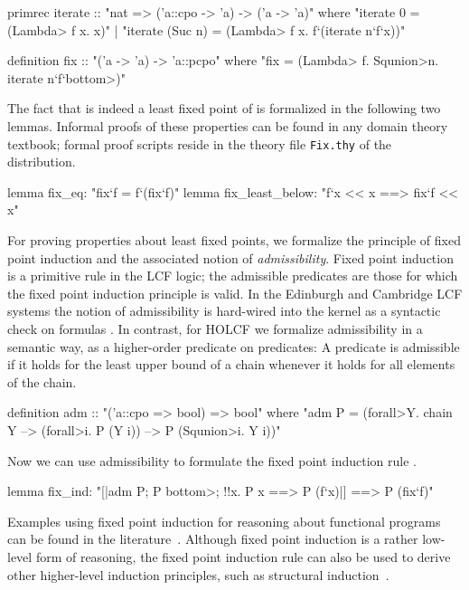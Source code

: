 \begin{isacode}
primrec iterate :: "nat => ('a::cpo -> 'a) -> ('a -> 'a)"
  where "iterate 0 = (\<Lambda> f x. x)"
  | "iterate (Suc n) = (\<Lambda> f x. f`(iterate n`f`x))"
\end{isacode}
\unmedskip
{}
\begin{isacode}
definition fix :: "('a -> 'a) -> 'a::pcpo"
  where "fix = (\<Lambda> f. \<Squnion>n. iterate n`f`\<bottom>)"
\end{isacode}

The fact that  is indeed a least fixed point of  is formalized in the following two lemmas. Informal proofs of these properties can be found in any domain theory textbook; formal proof scripts reside in the theory file \texttt{Fix.thy} of the  distribution.

\begin{isacodes}
lemma fix_eq: "fix`f = f`(fix`f)"
lemma fix_least_below: "f`x << x ==> fix`f << x"
\end{isacodes}

For proving properties about least fixed points, we formalize the principle of fixed point induction and the associated notion of \emph{admissibility}. Fixed point induction is a primitive rule in the LCF logic; the admissible predicates are those for which the fixed point induction principle is valid. In the Edinburgh and Cambridge LCF systems the notion of admissibility is hard-wired into the kernel as a syntactic check on formulas \cite{GMW79, paulson87lcf}. In contrast, for HOLCF we formalize admissibility in a semantic way, as a higher-order predicate on predicates: A predicate  is admissible if it holds for the least upper bound of a chain whenever it holds for all elements of the chain.

\begin{isacode}
definition adm :: "('a::cpo => bool) => bool"
  where "adm P = (\<forall>Y. chain Y --> (\<forall>i. P (Y i)) --> P (\<Squnion>i. Y i))"
\end{isacode}
%
Now we can use admissibility to formulate the fixed point induction rule . 
%
\begin{isacode}
lemma fix_ind: "[|adm P; P \<bottom>; !!x. P x ==> P (f`x)|] ==> P (fix`f)"
\end{isacode}

\noindent
Examples using fixed point induction for reasoning about functional programs can be found in the literature~\cite{Gibbons2005}. Although fixed point induction is a rather low-level form of reasoning, the fixed point induction rule can also be used to derive other higher-level induction principles, such as structural induction~\cite{paulson84}. %

